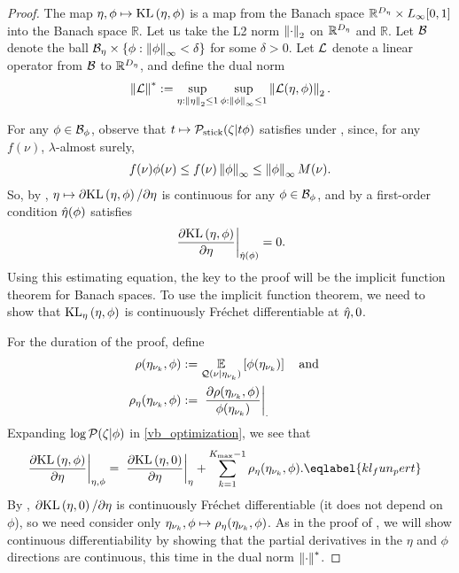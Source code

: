 \begin{proof}
%
The map $\eta, \phi \mapsto \mathrm{KL}\left(\eta, \phi\right)$ is a map from the Banach space
$\mathbb{R}^{D_{\eta}} \times {L_{\infty}[0,1]}$ into the Banach space $\mathbb{R}$. Let us
take the L2 norm $\left\Vert\cdot\right\Vert_2$ on $\mathbb{R}^{{D_{\eta}}}$ and $\mathbb{R}$.
Let $\mathcal{B}$ denote the ball $\mathcal{B}_\eta \times \{ \phi: \left\Vert\phi\right\Vert_{\infty} <
\delta\}$ for some $\delta > 0$.  Let $\mathcal{L}$ denote a linear operator from
$\mathcal{B}$ to $\mathbb{R}^{D_{\eta}}$, and define the dual norm
%
\begin{align*}
%
\norm{\linop}^* :=
    \sup_{\eta: \norm{\eta}_2 \le 1} \sup_{\phi: \norminf{\phi} \le 1}
     \norm{\linop(\eta, \phi)}_2.
%
\end{align*}

For any $\phi \in \mathcal{B}_\phi$, observe that $t \mapsto \mathcal{P}_{\mathrm{stick}}(\zeta \vert t
\phi)$ satisfies  under ,
since, for any $f(\nu)$, $\lambda$-almost surely,
%
\begin{align*}
%
f(\nu) \phi(\nu) \le f(\nu) \norminf{\phi} \le \norminf{\phi} M(\nu).
%
\end{align*}
%
So, by , $\eta \mapsto \partial \mathrm{KL}\left(\eta, \phi\right) /
\partial \eta$ is continuous for any $\phi \in \mathcal{B}_\phi$, and by a first-order
condition $\hat\eta(\phi)$ satisfies
%
\begin{align*}
%
\fracat{\partial \KL{\eta, \phi}}
                {\partial \eta}
                {\etaopt(\phi)} = 0.
%
\end{align*}
%
Using this estimating equation, the key to the proof will be the implicit
function theorem for Banach spaces. To use the implicit function theorem, we
need to show that $\mathrm{KL}_{\eta}\left(\eta, \phi\right)$ is continuously Fr{\'e}chet
differentiable at $\hat\eta, 0$.


For the duration of the proof, define
%
\begin{align*}
%
\rho(\etanuk, \phi) :={}&
    \expect{\q(\nu \vert \etanuk)}{\phi(\etanuk)}
\mathand\\
\rho_\eta(\etanuk, \phi) :={}&
    \fracat{\partial \rho(\etanuk, \phi)}{\phi(\etanuk)}.
%
\end{align*}
%
Expanding $\log \mathcal{P}(\zeta \vert \phi)$ in \eqref{vb_optimization}, we see that
%
\begin{align}
\fracat{\partial \KL{\eta, \phi}}{\partial \eta}{\eta, \phi}
 ={}&
    \fracat{\partial \KL{\eta, \phiz}}{\partial \eta}{\eta} +
    \sumkm \rho_\eta(\etanuk, \phi). \eqlabel{kl_fun_pert}
%
\end{align}
%
By , $\partial \mathrm{KL}\left(\eta, 0\right) / \partial \eta$ is
continuously Fr{\'e}chet differentiable (it does not depend on $\phi$), so we
need consider only $\eta_{\nu_{k}}, \phi \mapsto \rho_\eta(\eta_{\nu_{k}}, \phi)$.  As
in the proof of , we will show continuous differentiability
by showing that the partial derivatives in the $\eta$ and $\phi$ directions
are continuous, this time in the dual norm $\left\Vert\cdot\right\Vert^*$.


\end{proof}
